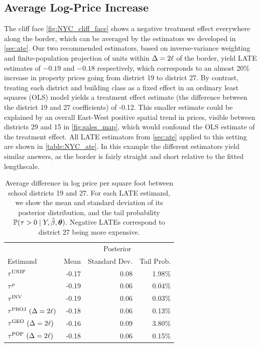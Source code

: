 \subsection{Average Log-Price Increase}
The cliff face \autoref{fig:NYC_cliff_face} shows a negative treatment effect everywhere along the border, which can be averaged by the estimators we developed in \autoref{sec:ate}.
Our two recommended estimators, based on inverse-variance weighting and finite-population projection of units within \(\Delta=2\ell\) of the border, yield LATE estimates of \(-0.19\) and \(-0.18\) respectively, which corresponds to an almost 20\% increase in property prices going from district 19 to district 27.
By contrast, treating each district and building class as a fixed effect in an ordinary least squares (OLS) model yields a treatment effect estimate (the difference between the district 19 and 27 coefficients) of -0.12. 
This smaller estimate could be explained by an overall East-West positive spatial trend in prices, visible between districts 29 and 15 in \autoref{fig:sales_map}, which would confound the OLS estimate of the treatment effect.
All LATE estimators from \autoref{sec:ate} applied to this setting are shown in \autoref{table:NYC_ate}.
In this example the different estimators yield similar answers, as the border is fairly straight and short relative to the fitted lengthscale.


\begin{table}
    \centering
    \begin{tabular}{lrrr}
        \hline
        & \multicolumn{3}{c}{Posterior} \\
        Estimand & Mean & Standard Dev. & Tail Prob. \\
        \hline
	      \(\tau^{\mathrm{UNIF}}\) & -0.17 & 0.08 & 1.98\% \\
	      \(\tau^{\rho}\) & -0.19 & 0.06 & 0.04\% \\
	      \(\tau^{\mathrm{INV}}\) & -0.19 & 0.06 & 0.03\% \\
	      \(\tau^{\mathrm{PROJ}}~(\Delta=2\ell)\) & -0.18 & 0.06 & 0.13\% \\
		  \(\tau^{\mathrm{GEO}}~(\Delta=2\ell)\) & -0.16 & 0.09 & 3.80\% \\
		  \(\tau^{\mathrm{POP}}~(\Delta=2\ell)\) & -0.18 & 0.06 & 0.15\% \\
        \hline
    \end{tabular}
    \caption{
    \label{table:NYC_ate}
Average difference in log price per square foot between school districts 19 and 27. For each LATE estimand, we show the mean and standard deviation of its posterior distribution, and the tail probability \(\operatorname{\mathbb{P}}(\tau > 0 \mid Y, \hat{\beta}, \bm{\theta})\). 
Negative LATEs correspond to district 27 being more expensive.
}
\end{table}

